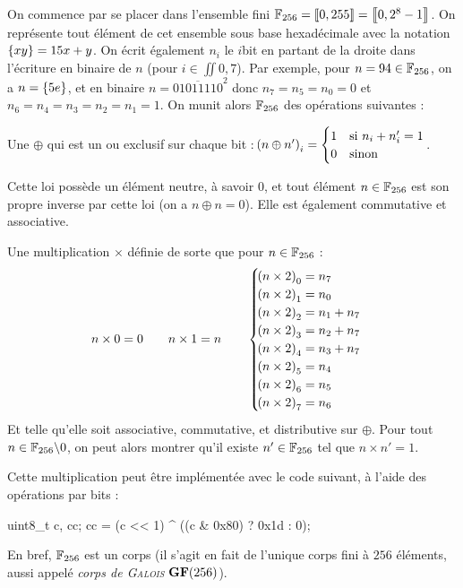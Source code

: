 \documentclass[a4paper,french,bookmarks]{article}
\begin{document}
    On commence par se placer dans l'ensemble fini $\mathbb{F}_{256} = \left\llbracket0, 255\right\rrbracket = \left\llbracket0, 2^8 - 1\right\rrbracket$. On représente tout élément de cet ensemble sous base hexadécimale avec la notation $\left\{xy\right\} = 15x + y$. On écrit également $n_i$ le $i$\ieme bit en partant de la droite dans l'écriture en binaire de $n$ (pour $i \in \iint{0, 7}$). Par exemple, pour $n = 94 \in \mathbb{F}_{256}$, on a $n = \left\{5e\right\}$, et en binaire $n = \overline{01011110}^2$ donc $n_7 = n_5 = n_0 = 0$ et $n_6 = n_4 = n_3 = n_2 = n_1 = 1$. On munit alors $\mathbb{F}_{256}$ des opérations suivantes :
    \begin{enumerate}
        \itt Une  $\oplus$ qui est un ou exclusif sur chaque bit : $\!\left(n \oplus n'\right)_i = \begin{cases}
            1 &\text{si } n_i + n_i' = 1\\
            0 &\text{sinon}
        \end{cases}$.

        Cette loi possède un élément neutre, à savoir $0$, et tout élément $n \in \mathbb{F}_{256}$ est son propre inverse par cette loi (on a $n \oplus n = 0$). Elle est également commutative et associative. 

        \itt Une multiplication $\times$ définie de sorte que pour $n \in \mathbb{F}_{256}$ :
        \[ n \times 0 = 0\qquad n \times 1 = n \qquad \begin{cases}\p{n \times 2}_0 = n_7\\
        \p{n \times 2}_1 = n_0\\
        \p{n \times 2}_2 = n_1 + n_7\\
        \p{n \times 2}_3 = n_2 + n_7\\
        \p{n \times 2}_4 = n_3 + n_7\\
        \p{n \times 2}_5 = n_4\\
        \p{n \times 2}_6 = n_5\\
        \p{n \times 2}_7 = n_6
        \end{cases}\]
        Et telle qu'elle soit associative, commutative, et distributive sur $\oplus$. Pour tout $n \in \mathbb{F}_{256} \backslash 0$, on peut alors montrer qu'il existe $n' \in \mathbb{F}_{256}$ tel que $n \times n' = 1$.
    \end{enumerate}
    Cette multiplication peut être implémentée avec le code suivant, à l'aide des opérations par bits :
    \begin{C}
uint8_t c, cc;
cc = (c << 1) ^ ((c & 0x80) ? 0x1d : 0);
    \end{C}
    En bref, $\mathbb{F}_{256}$ est un corps (il s'agit en fait de l'unique corps fini à $256$ éléments, aussi appelé \emph{corps de \textsc{Galois} $\mathbf{G}\mathbf{F}\!\left(256\right)$}).
\end{document}
